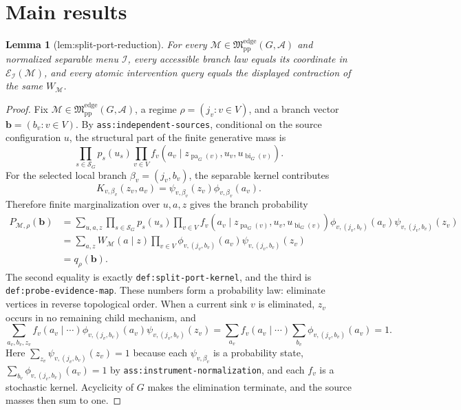 \documentclass{article}
\newtheorem{lemma}{Lemma}
\begin{document}
\section{Main results}

\begin{lemma}[lem:split-port-reduction]\label{lem:split-port-reduction}
For every \(\mathcal M\in\mathfrak M_{\mathrm{pp}}^{\mathrm{edge}}(G,\mathcal A)\) and normalized separable menu \(\mathcal I\), every accessible branch law equals its coordinate in \(\mathcal E_{\mathcal I}(\mathcal M)\), and every atomic intervention query equals the displayed contraction of the same \(W_{\mathcal M}\).
\end{lemma}
\begin{proof}
Fix \(\mathcal M\in\mathfrak M_{\mathrm{pp}}^{\mathrm{edge}}(G,\mathcal A)\), a regime \(\rho=(j_v:v\in V)\), and a branch vector \(\boldsymbol b=(b_v:v\in V)\).  By \texttt{ass:independent-sources}, conditional on the source configuration \(u\), the structural part of the finite generative mass is
\[
 \prod_{s\in\mathcal S_G}p_s(u_s)
 \prod_{v\in V}f_v\!\left(a_v\mid
 z_{\operatorname{pa}_G(v)},u_v,u_{\operatorname{bi}_G(v)}\right).
\]
For the selected local branch \(\beta_v=(j_v,b_v)\), the separable kernel contributes
\[
 K_{v,\beta_v}(z_v,a_v)
 =\psi_{v,\beta_v}(z_v)\phi_{v,\beta_v}(a_v).
\]
Therefore finite marginalization over \(u,a,z\) gives the branch probability
\[
\begin{aligned}
 P_{\mathcal M,\rho}(\boldsymbol b)
 &=\sum_{u,a,z}
 \prod_{s\in\mathcal S_G}p_s(u_s)
 \prod_{v\in V}
 f_v\!\left(a_v\mid z_{\operatorname{pa}_G(v)},u_v,
 u_{\operatorname{bi}_G(v)}\right)
 \phi_{v,(j_v,b_v)}(a_v)\psi_{v,(j_v,b_v)}(z_v)\\
 &=\sum_{a,z}W_{\mathcal M}(a\mid z)
 \prod_{v\in V}\phi_{v,(j_v,b_v)}(a_v)
 \psi_{v,(j_v,b_v)}(z_v)\\
 &=q_\rho(\boldsymbol b).
\end{aligned}
\]
The second equality is exactly \texttt{def:split-port-kernel}, and the third is \texttt{def:probe-evidence-map}.  These numbers form a probability law: eliminate vertices in reverse topological order.  When a current sink \(v\) is eliminated, \(z_v\) occurs in no remaining child mechanism, and
\[
 \sum_{a_v,b_v,z_v}f_v(a_v\mid\cdots)
 \phi_{v,(j_v,b_v)}(a_v)\psi_{v,(j_v,b_v)}(z_v)
 =\sum_{a_v}f_v(a_v\mid\cdots)
 \sum_{b_v}\phi_{v,(j_v,b_v)}(a_v)=1.
\]
Here \(\sum_{z_v}\psi_{v,(j_v,b_v)}(z_v)=1\) because each \(\psi_{v,\beta_v}\) is a probability state, \(\sum_{b_v}\phi_{v,(j_v,b_v)}(a_v)=1\) by \texttt{ass:instrument-normalization}, and each \(f_v\) is a stochastic kernel.  Acyclicity of \(G\) makes the elimination terminate, and the source masses then sum to one.


\end{proof}
\end{document}
